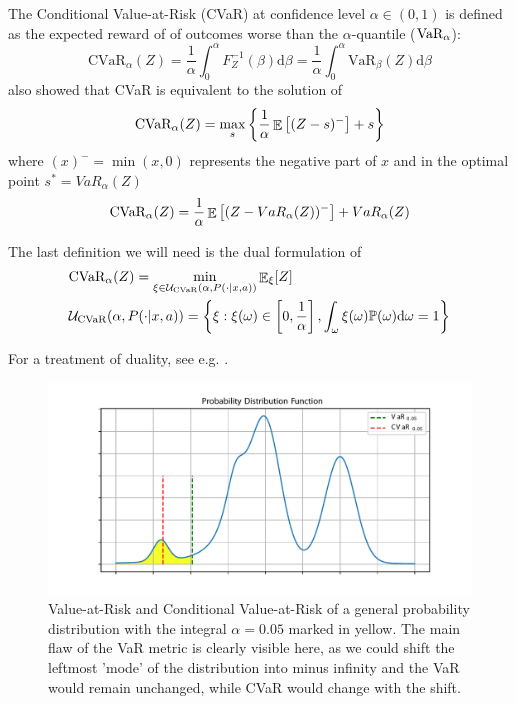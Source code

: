 The Conditional Value-at-Risk (CVaR) at confidence level $\alpha \in (0,1)$ is defined as the expected reward of of outcomes worse than the $\alpha$-quantile ($\text{VaR}_\alpha$):
\begin{equation}\label{eqn:cvardef}
\text{CVaR}_\alpha(Z) = \dfrac{1}{\alpha}\int_0^\alpha F^{-1}_Z(\beta) \text{d}\beta = \dfrac{1}{\alpha}\int_0^\alpha \text{VaR}_\beta(Z) \text{d}\beta
\end{equation}
\citet{rockafellar2000optimization} also showed that CVaR is equivalent to the solution of
\begin{equation}\label{eqn:cvarprimal}
\text{CVaR}_\alpha(Z)=
\max_s\left\lbrace \dfrac{1}{\alpha}\mathop{\mathbb{E}}
\left[ (Z-s)^-\right] + s  \right\rbrace 
\end{equation}
where $(x)^- = \min(x, 0)$ represents the negative part of $x$ and in the optimal point $s^* = VaR_\alpha(Z)$
\begin{equation}
\text{CVaR}_\alpha(Z)= \dfrac{1}{\alpha}\mathop{\mathbb{E}} \left[ (Z-VaR_\alpha(Z))^-\right] + VaR_\alpha(Z)
\end{equation}

The last definition we will need is the dual formulation of 
\begin{align}\label{eqn:cvardual}
&\text{CVaR}_\alpha(Z)= \min_{\xi \in \mathcal{U}_{\text{CVaR}}(\alpha, P(\cdot | x, a))}\mathop{\mathbb{E}}\nolimits_\xi[Z]\\
&\mathcal{U}_{\text{CVaR}}(\alpha, P(\cdot | x, a)) = \left\{ {\xi : \xi(\omega) \in \left[ {0, \frac{1}{\alpha}} \right], \int_{\omega} \xi(\omega)\mathbb{P}(\omega) \text{d}\omega = 1} \right\}\label{eqn:envelope}
\end{align}


For a treatment of duality, see e.g. \citet{boyd2004convex}.

\begin{figure}
\center
\includegraphics[width=\linewidth]{gfx/pdf.pdf}
\caption{Value-at-Risk and Conditional Value-at-Risk of a general probability distribution with the integral $\alpha=0.05$ marked in yellow. The main flaw of the VaR metric is clearly visible here, as we could shift the leftmost 'mode' of the distribution into minus infinity and the VaR would remain unchanged, while CVaR would change with the shift.}
\end{figure}




